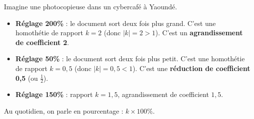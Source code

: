 \documentclass[11pt]{article}
\begin{document}
\begin{exemplebox}
Imagine une photocopieuse dans un cybercafé à Yaoundé.
\begin{itemize}
    \item \textbf{Réglage 200\%} : le document sort deux fois plus grand. C'est une homothétie de rapport $k = 2$ (donc $|k|=2>1$). C'est un \textbf{agrandissement de coefficient 2}.
    \item \textbf{Réglage 50\%} : le document sort deux fois plus petit. C'est une homothétie de rapport $k = 0,5$ (donc $|k|=0,5<1$). C'est une \textbf{réduction de coefficient 0,5} (ou $\frac{1}{2}$).
    \item \textbf{Réglage 150\%} : rapport $k = 1,5$, agrandissement de coefficient $1,5$.
\end{itemize}
Au quotidien, on parle en pourcentage : $k \times 100\%$.
\end{exemplebox}
\end{document}
